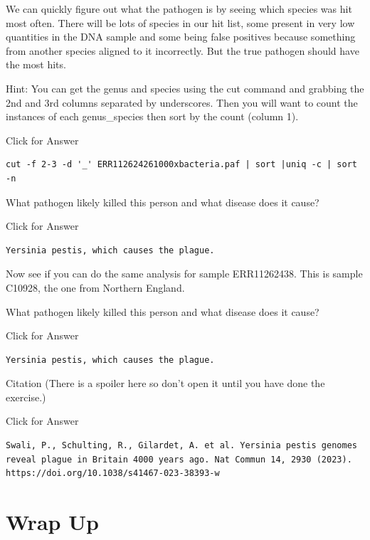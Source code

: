 \documentclass[
]{book}
\begin{document}
We can quickly figure out what the pathogen is by seeing which species was hit most often. There will be lots of species in our hit list, some present in very low quantities in the DNA sample and some being false positives because something from another species aligned to it incorrectly. But the true pathogen should have the most hits.

Hint: You can get the genus and species using the cut command and grabbing the 2nd and 3rd columns separated by underscores. Then you will want to count the instances of each genus\_species then sort by the count (column 1).

Click for Answer

\begin{verbatim}
cut -f 2-3 -d '_' ERR112624261000xbacteria.paf | sort |uniq -c | sort -n
\end{verbatim}

\hfill\break

What pathogen likely killed this person and what disease does it cause?

Click for Answer

\begin{verbatim}
Yersinia pestis, which causes the plague.
\end{verbatim}

\hfill\break

Now see if you can do the same analysis for sample ERR11262438. This is sample C10928, the one from Northern England.

What pathogen likely killed this person and what disease does it cause?

Click for Answer

\begin{verbatim}
Yersinia pestis, which causes the plague.
\end{verbatim}

\hfill\break

Citation (There is a spoiler here so don't open it until you have done the exercise.)

Click for Answer

\begin{verbatim}
Swali, P., Schulting, R., Gilardet, A. et al. Yersinia pestis genomes reveal plague in Britain 4000 years ago. Nat Commun 14, 2930 (2023). https://doi.org/10.1038/s41467-023-38393-w
\end{verbatim}

\hypertarget{wrap-up}{%
\chapter{Wrap Up}\label{wrap-up}}
\end{document}
